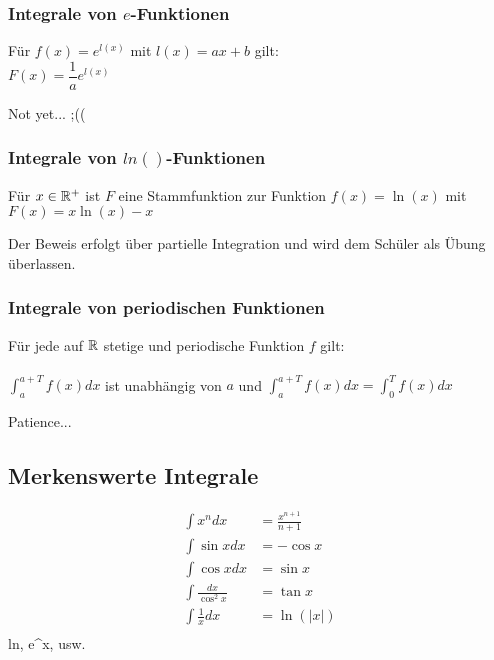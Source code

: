 \subsubsection{Integrale von $e$-Funktionen}
\begin{Theorem}
  Für $f(x)=e^{l(x)}$ mit $l(x) = ax+b$ gilt:\\
  $F(x) = \dfrac{1}{a}e^{l(x)}$
\end{Theorem}
\begin{Beweis}
  Not yet... ;((
\end{Beweis}
\subsubsection{Integrale von $ln()$-Funktionen}
\begin{Theorem}
  Für $x \in \mathbb{R}^{+}$ ist $F$ eine Stammfunktion zur Funktion $f(x) = \ln(x)$ mit $F(x) = x \ln(x)-x$
\end{Theorem}
\begin{Beweis}
  Der Beweis erfolgt über partielle Integration und wird dem Schüler als Übung überlassen.
\end{Beweis}
\subsubsection{Integrale von periodischen Funktionen}
\begin{Theorem}
  Für jede auf $\mathbb{R}$ stetige und periodische Funktion $f$ gilt:\\\\
  $\int_a^{a+T} f(x)dx$ ist unabhängig von $a$ und $\int_a^{a+T} f(x)dx = \int_0^{T} f(x)dx$
\end{Theorem}
\begin{Beweis}
  Patience...
\end{Beweis}

\subsection{Merkenswerte Integrale}
\begin{align*}
  \int x^n dx&=\frac{x^{n+1}}{n+1}\\
  \int\sin x dx&= -\cos x\\
  \int\cos x dx&= \sin x\\
  \int\frac{ dx}{\cos^2x}&= \tan x\\
  \int\frac{1}{x} dx&= \ln(|x|)\\
\end{align*}
ln, e^x, usw.

